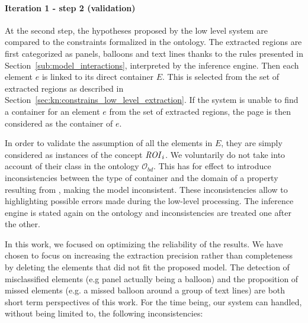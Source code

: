 \paragraph{Iteration 1 - step 2 (validation)} %
\label{par:step_2}
At the second step, the hypotheses proposed by the low level system are compared to the constraints formalized in the ontology.
The extracted regions are first categorized as panels, balloons and text lines thanks to the rules presented in Section~\ref{sub:model_interactions}, interpreted by the inference engine.
Then each element $e$ is linked to its direct container $E$.
This is selected from the set of extracted regions as described in Section~\ref{sec:kn:constrains_low_level_extraction}.
If the system is unable to find a container for an element $e$ from the set of extracted regions, the page is then considered as the container of $e$.

In order to validate the assumption of all the elements in $E$, they are simply considered as instances of the concept ${\it ROI}_i$.
We voluntarily do not take into account of their class in the ontology $\mathcal{O}_ {bd}$.
This has for effect to introduce inconsistencies between the type of container and the domain of a property resulting from , making the model inconsistent.
These inconsistencies allow to highlighting possible errors made during the low-level processing.
The inference engine is stated again on the ontology and inconsistencies are treated one after the other.

In this work, we focused on optimizing the reliability of the results.
We have chosen to focus on increasing the extraction precision rather than completeness by deleting the elements that did not fit the proposed model.
The detection of misclassified elements (e.g panel actually being a balloon) and the proposition of missed elements (e.g. a missed balloon around a group of text lines) are both short term perspectives of this work.
For the time being, our system can handled, without being limited to, the following inconsistencies:

